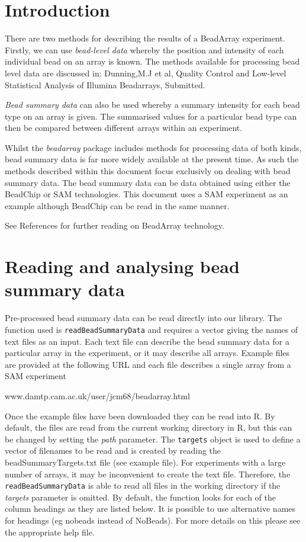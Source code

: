\documentclass[a4paper]{article}
\newcommand{\Robject}[1]{{\texttt{#1}}}
\newcommand{\Rfunction}[1]{{\texttt{#1}}}
\newcommand{\Rpackage}[1]{{\textit{#1}}}
\newcommand{\Rfunarg}[1]{{\textit{#1}}}
\begin{document}
\section{Introduction}
\label{intro}

There are two methods for describing the results of a BeadArray experiment. Firstly, we can use \emph{bead-level data} whereby the position and intensity of each individual bead on an array is known. The methods available for processing bead level data are discussed in: Dunning,M.J et al, Quality Control and Low-level Statistical Analysis of Illumina Beadarrays, Submitted.

\emph{Bead summary data} can also be used whereby a summary intensity for each bead type on an array is given. The summarised values for a particular bead type can then be compared 
between different arrays within an experiment.

Whilst the \Rpackage{beadarray} package includes methods for
processing data of both kinds, bead summary data is far more widely
available at the present time.  As such the methods described within
this document focus exclusivly on dealing with bead summary data. The
bead summary data can be data obtained using either the BeadChip or
SAM technologies. This document uses a SAM experiment as an example
although BeadChip can be read in the same manner.

See References for further reading on BeadArray technology.


\section{Reading and analysing bead summary data}

Pre-processed bead summary data can be read directly into our
library. The function used is \Rfunction{readBeadSummaryData} and
requires a vector giving the names of text files as an input. Each
text file can describe the bead summary data for a particular array in
the experiment, or it may describe all arrays. Example files are
provided at the following URL and each file describes a single array
from a SAM experiment

 www.damtp.cam.ac.uk/user/jcm68/beadarray.html

Once the example files have been downloaded they can be read into {\sf R}. By default, the files are read from the current working directory in R, but this can be changed by setting the \Rfunarg{path} parameter. The \Robject{targets} object is used to define a vector of filenames to be read and is created by reading the beadSummaryTargets.txt file (see example file). For experiments with a large number of arrays, it may be inconvenient to create the text file. Therefore, the \Rfunction{readBeadSummaryData} is able to read all files in the working directory if the \Rfunarg{targets} parameter is omitted. By default, the function looks for each of the column headings as they are listed below. It is possible to use alternative names for headings (eg nobeads instead of NoBeads). For more details on this please see the appropriate help file.
\end{document}
